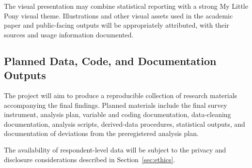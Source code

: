 The visual presentation may combine statistical reporting with a strong My Little Pony visual theme. Illustrations and other visual assets used in the academic paper and public-facing outputs will be appropriately attributed, with their sources and usage information documented.


\subsection{Planned Data, Code, and Documentation Outputs}

The project will aim to produce a reproducible collection of research materials accompanying the final findings. Planned materials include the final survey instrument, analysis plan, variable and coding documentation, data-cleaning documentation, analysis scripts, derived-data procedures, statistical outputs, and documentation of deviations from the preregistered analysis plan.

The availability of respondent-level data will be subject to the privacy and disclosure considerations described in Section~\ref{sec:ethics}.

